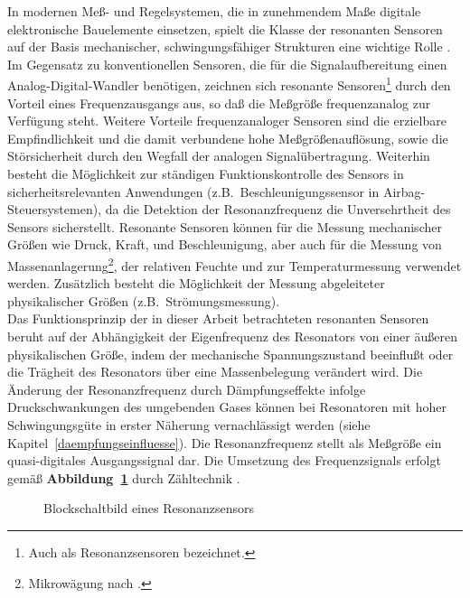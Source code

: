 In modernen Meß- und Regelsystemen, die in zunehmendem Maße digitale
elektronische Bauelemente einsetzen, spielt die Klasse der resonanten
Sensoren auf der Basis mechanischer, schwingungsfähiger Strukturen eine
wichtige Rolle \cite{Bue91b}. Im Gegensatz zu
konventionellen Sensoren, die für die Signalaufbereitung einen
Analog-Digital-Wandler benötigen, zeichnen sich resonante
Sensoren\footnote{Auch als Resonanzsensoren bezeichnet.} durch
den Vorteil eines Frequenzausgangs aus, so daß die Meßgröße
frequenzanalog zur Verfügung steht. Weitere Vorteile frequenzanaloger
Sensoren sind die erzielbare Empfindlichkeit und die damit
verbundene hohe Meßgrößenauflösung, sowie die Störsicherheit durch
den Wegfall der analogen Signalübertragung. Weiterhin besteht
die Möglichkeit zur ständigen Funktionskontrolle des Sensors in
sicherheitsrelevanten Anwendungen (z.B.\ Beschleunigungssensor in
Airbag-Steuersystemen), da die Detektion der Resonanzfrequenz die
Unversehrtheit des Sensors sicherstellt. Resonante
Sensoren können für die Messung mechanischer Größen wie Druck, Kraft,
und Beschleunigung, aber auch für die Messung von
Massenanlagerung\footnote{Mikrowägung nach \cite{Sau59}.},
der relativen Feuchte und zur Temperaturmessung verwendet werden.
Zusätzlich besteht die Möglichkeit der Messung abgeleiteter physikalischer
Größen (z.B.\ Strömungsmessung).\\
Das Funktionsprinzip der in dieser Arbeit betrachteten
resonanten Sensoren beruht auf der Abhängigkeit der Eigenfrequenz
des Resonators von einer äußeren physikalischen Größe, indem der
mechanische Spannungszustand beeinflußt oder die Trägheit des Resonators
über eine Massenbelegung verändert wird. Die Änderung der
Resonanzfrequenz durch Dämpfungseffekte infolge Druckschwankungen des
umgebenden Gases
können bei Resonatoren mit hoher Schwingungsgüte in erster Näherung
vernachlässigt werden (siehe Kapitel~\ref{daempfungseinfluesse}).
Die Resonanzfrequenz stellt als Meßgröße
ein quasi-digitales Ausgangssignal dar. Die Umsetzung des Frequenzsignals
erfolgt gemäß {\bf Abbildung~\ref{abbprinzip}} durch Zähltechnik
\cite{ABV93}.
\begin{figure}[htb]
\begin{center}

\setresosen
\end{center}
 \caption{\label{abbprinzip}
 Blockschaltbild eines Resonanzsensors}
\end{figure}
